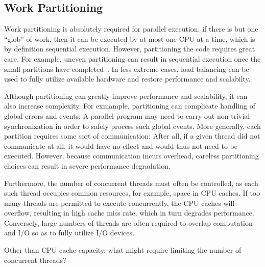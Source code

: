 \subsection{Work Partitioning}
\label{sec:intro:Work Partitioning}

Work partitioning is absolutely required for parallel execution:
if there is but one ``glob'' of work, then it can be executed by at
most one CPU at a time, which is by definition sequential execution.
However, partitioning the code requires great care.
For example, uneven partitioning can result in sequential execution
once the small partitions have completed~\cite{GeneAmdahl1967AmdahlsLaw}.
In less extreme cases, load balancing can be used to fully utilize
available hardware and restore performance and scalabilty.

Although partitioning can greatly improve performance and scalability,
it can also increase complexity.
For exmample, partitioning can complicate handling of global
errors and events: A parallel
program may need to carry out non-trivial synchronization in order
to safely process such global events.
More generally, each partition requires some sort of communication:
After all, if
a given thread did not communicate at all, it would have no effect and
would thus not need to be executed.
However, because communication incurs overhead, careless partitioning choices
can result in severe performance degradation.

Furthermore, the number of concurrent threads must often be controlled,
as each such thread occupies common resources, for example,
space in CPU caches.
If too many threads are permitted to execute concurrently, the
CPU caches will overflow, resulting in high cache miss rate, which in
turn degrades performance.
Conversely, large numbers of threads are often required to
overlap computation and I/O so as to fully utilize I/O devices.

\QuickQuiz{}
	Other than CPU cache capacity, what might require limiting the
	number of concurrent threads?
 \QuickQuizEnd

